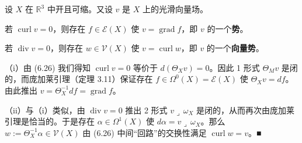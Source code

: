 \begin{corollary}

设 $ X $ 在 $ \mathbb{R}^{3} $ 中开且可缩。又设 $ v $ 是 $ X $ 上的光滑向量场。

\begin{subitems}
\item

若 $ \operatorname{curl} v = 0 $，则存在 $ f \in \mathcal{E}(X) $ 使 $ v = \operatorname{grad} f $，即 $ v $ 的一个\textbf{势}。

\item

若 $ \operatorname{div} v = 0 $，则存在 $ w \in \mathcal{V}(X) $ 使 $ v = \operatorname{curl} w $，即 $ v $ 的一个\textbf{向量势}。

\proofhead
（i）由 (6.26) 我们得知 $ \operatorname{curl} v = 0 $ 等价于 $ d(\Theta_{X} v) = 0 $。因此 1 形式 $ \Theta_{M} v $ 是闭的，而庞加莱引理（定理 3.11）保证存在 $ f \in \Omega^{0}(X) = \mathcal{E}(X) $ 使 $ \Theta_{X} v = df $。由此推出 $ v = \Theta_{X}^{-1} df = \operatorname{grad} f $。
\end{subitems}

（ii）与（i）类似，由 $ \operatorname{div} v = 0 $ 推出 2 形式 $ v \lrcorner\, \omega_{X} $ 是闭的，从而再次由庞加莱引理是恰当的。于是存在 $ \alpha \in \Omega^{1}(X) $ 使 $ d\alpha = v \lrcorner\, \omega_{X} $。那么 $ w := \Theta_{X}^{-1} \alpha \in \mathcal{V}(X) $ 由 (6.26) 中间“回路”的交换性满足 $ \operatorname{curl} w = v $。\nobreak\hspace{0.35em}■

\end{corollary}

